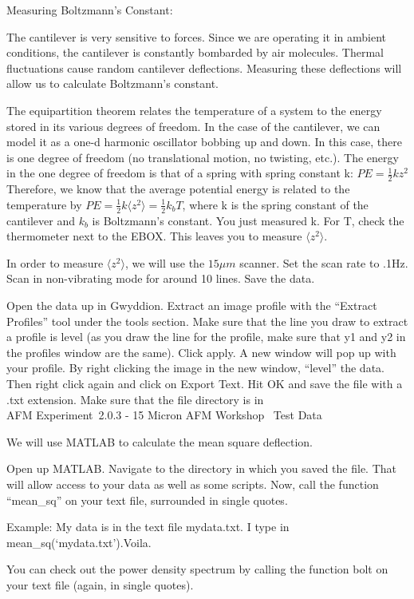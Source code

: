 \documentclass{../lab}
\begin{document}
Measuring Boltzmann's Constant:

The cantilever is very sensitive to forces. Since we are operating it in ambient conditions, the cantilever is constantly bombarded by air molecules. Thermal fluctuations cause random cantilever deflections. Measuring these deflections will allow us to calculate Boltzmann’s constant.

The equipartition theorem relates the temperature of a system to the energy stored in its various degrees of freedom. In the case of the cantilever, we can model it as a one-d harmonic oscillator bobbing up and down. In this case, there is one degree of freedom (no translational motion, no twisting, etc.). The energy in the one degree of freedom is that of a spring with spring constant k: $PE = \frac{1}{2} kz^{2}$ Therefore, we know that the average potential energy is related to the temperature by $PE = \frac{1}{2} k \langle z^{2} \rangle = \frac{1}{2} k_{b} T$, where k is the spring constant of the cantilever and $k_{b}$ is Boltzmann’s constant. You just measured k. For T, check the thermometer next to the EBOX. This leaves you to measure $\langle z^{2} \rangle$.

In order to measure $\langle z^{2} \rangle$, we will use the $15\mu m$ scanner. Set the scan rate to .1Hz. Scan in non-vibrating mode for around 10 lines. Save the data.

Open the data up in Gwyddion. Extract an image profile with the ``Extract Profiles'' tool under the tools section. Make sure that the line you draw to extract a profile is level (as you draw the line for the profile, make sure that y1 and y2 in the profiles window are the same). Click apply. A new window will pop up with your profile.  By right clicking the image in the new window, ``level'' the data. Then right click again and click on Export Text. Hit OK and save the file with a .txt extension. Make sure that the file directory is in \\AFM Experiment\ 2.0.3 - 15 Micron AFM Workshop \ Test Data

We will use MATLAB to calculate the mean square deflection.

Open up MATLAB. Navigate to the directory in which you saved the file. That will allow access to your data as well as some scripts. Now, call the function ``mean\_sq'' on your text file, surrounded in single quotes.

Example: My data is in the text file mydata.txt. I type in mean\_sq(‘mydata.txt’).Voila.

You can check out the power density spectrum by calling the function bolt on your text file (again, in single quotes).
\end{document}
